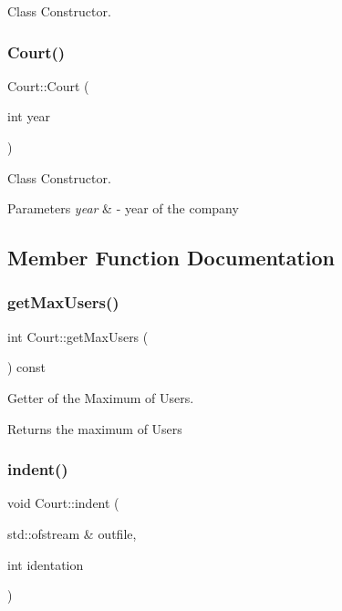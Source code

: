 Class Constructor. 

\mbox{\label{class_court_a594463e426e762163a09290e48d1d437}} 
\subsubsection{\texorpdfstring{Court()}{Court()}\hspace{0.1cm}{\footnotesize\ttfamily [2/2]}}
{\footnotesize\ttfamily Court\+::\+Court (\begin{DoxyParamCaption}\item[{int}]{year }\end{DoxyParamCaption})}



Class Constructor. 


\begin{DoxyParams}{Parameters}
{\em year} & -\/ year of the company \\
\hline
\end{DoxyParams}


\subsection{Member Function Documentation}
\mbox{\label{class_court_a9992ef2a5d2ee81e8cc7f24f8c917f31}} 
\subsubsection{\texorpdfstring{get\+Max\+Users()}{getMaxUsers()}}
{\footnotesize\ttfamily int Court\+::get\+Max\+Users (\begin{DoxyParamCaption}{ }\end{DoxyParamCaption}) const}



Getter of the Maximum of Users. 

\begin{DoxyReturn}{Returns}
the maximum of Users 
\end{DoxyReturn}
\mbox{\label{class_court_ae08f3e2f1119073fffc251fc1e725550}} 
\subsubsection{\texorpdfstring{indent()}{indent()}}
{\footnotesize\ttfamily void Court\+::indent (\begin{DoxyParamCaption}\item[{std\+::ofstream \&}]{outfile,  }\item[{int}]{identation }\end{DoxyParamCaption})}



